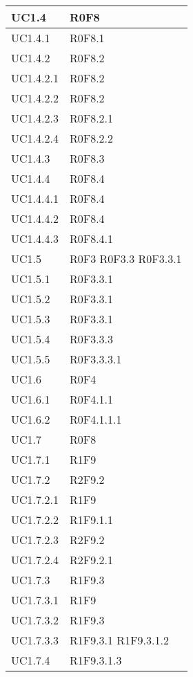 \begin{center}
\begin{longtable}{| p{4cm} | p{4cm} |}
		\hline
		UC1.4  &  R0F8 \\
		\hline
		UC1.4.1  &  R0F8.1 \\
		\hline
		UC1.4.2  &  R0F8.2 \\
		\hline
		UC1.4.2.1  &  R0F8.2 \\
		\hline
		UC1.4.2.2  &  R0F8.2 \\
		\hline
		UC1.4.2.3  &  R0F8.2.1 \\
		\hline
		UC1.4.2.4  &  R0F8.2.2 \\
		\hline
		UC1.4.3  &  R0F8.3 \\
		\hline
		UC1.4.4  &  R0F8.4 \\
		\hline
		UC1.4.4.1  &  R0F8.4 \\
		\hline
		UC1.4.4.2  &  R0F8.4 \\
		\hline
		UC1.4.4.3  &  R0F8.4.1 \\
		\hline
		UC1.5  &  R0F3 \newline R0F3.3 \newline R0F3.3.1 \\
		\hline
		UC1.5.1  &  R0F3.3.1 \\
		\hline
		UC1.5.2  &  R0F3.3.1 \\
		\hline
		UC1.5.3  &  R0F3.3.1 \\
		\hline
		UC1.5.4  &  R0F3.3.3 \\
		\hline
		UC1.5.5  &  R0F3.3.3.1 \\
		\hline
		UC1.6  &  R0F4 \\
		\hline
		UC1.6.1  &  R0F4.1.1 \\
		\hline
		UC1.6.2  &  R0F4.1.1.1 \\
		\hline
		UC1.7  &  R0F8 \\
		\hline
		UC1.7.1  &  R1F9 \\
		\hline
		UC1.7.2  &  R2F9.2 \\
		\hline
		UC1.7.2.1  &  R1F9 \\
		\hline
		UC1.7.2.2  &  R1F9.1.1 \\
		\hline
		UC1.7.2.3  &  R2F9.2 \\
		\hline
		UC1.7.2.4  &  R2F9.2.1 \\
		\hline
		UC1.7.3  &  R1F9.3 \\
		\hline
		UC1.7.3.1  &  R1F9 \\
		\hline
		UC1.7.3.2  &  R1F9.3 \\
		\hline
		UC1.7.3.3  &  R1F9.3.1 \newline R1F9.3.1.2 \\
		\hline
		UC1.7.4  &  R1F9.3.1.3 \\

\end{longtable}
\end{center}
